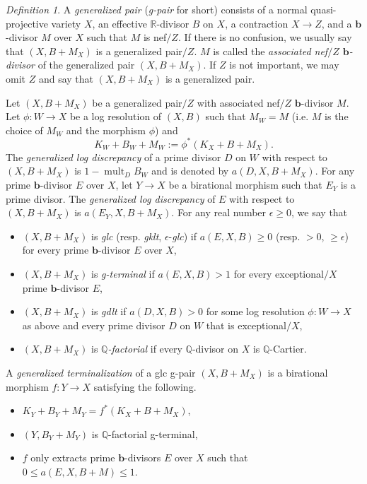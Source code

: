 \documentclass[11pt]{amsart}
\numberwithin{equation}{section}
\newcommand{\bb}{\bm{b}}
\newcommand{\Qq}{\mathbb{Q}}
\newcommand{\Rr}{\mathbb{R}}
\newcommand{\mult}{\operatorname{mult}}
\theoremstyle{definition}
\theoremstyle{remark}
\newtheorem{defn}[thm]{Definition}
\theoremstyle{definition}
\begin{document}
\begin{defn}\label{defn: gpair} A \emph{generalized pair} (\emph{g-pair} for short) consists of a normal quasi-projective variety $X$, an effective $\Rr$-divisor $B$ on $X$, a contraction $X\rightarrow Z$, and a $\bb$-divisor $M$ over $X$ such that $M$ is nef$/Z$. If there is no confusion, we usually say that $(X,B+M_X)$ is a generalized pair$/Z$. $M$ is called the \emph{associated nef$/Z$ $\bb$-divisor} of the generalized pair $(X,B+M_X)$. If $Z$ is not important, we may omit $Z$ and say that $(X,B+M_X)$ is a generalized pair.

Let $(X,B+M_X)$ be a generalized pair$/Z$ with associated nef$/Z$ $\bb$-divisor $M$. Let $\phi:W\to X$
	be a log resolution of $(X,B)$ such that $M_W=M$ (i.e. $M$ is the choice of $M_W$ and the morphism $\phi$) and
	$$K_W+B_W+M_W:=\phi^{*}(K_X+B+M_X).$$
	The \emph{generalized log discrepancy} of a prime divisor $D$ on $W$ with respect to $(X,B+M_X)$ is $1-\mult_{D}B_W$ and is denoted by $a(D,X,B+M_X).$ For any prime $\bb$-divisor $E$ over $X$, let $Y\rightarrow X$ be a birational morphism such that $E_Y$ is a prime divisor.  The \emph{generalized log discrepancy} of $E$ with respect to $(X,B+M_X)$ is $a(E_Y,X,B+M_X)$.
	For any real number $\epsilon\geq 0$, we say that
	\begin{itemize}
	    \item $(X,B+M_X)$ is \emph{glc} (resp. \emph{gklt}, $\epsilon$-\emph{glc}) if $a(E,X,B)\ge0$ (resp. $>0$, $\ge\epsilon$) for every prime $\bb$-divisor $E$ over $X$,
	    \item  $(X,B+M_X)$ is \emph{g-terminal} if $a(E,X,B)>1$ for every exceptional$/X$ prime $\bb$-divisor $E$,
	    \item $(X,B+M_X)$ is \emph{gdlt} if $a(D,X,B)>0$ for some log resolution $\phi:W\to X$ as above and every prime divisor $D$ on $W$ that is exceptional$/X$,
	    \item $(X,B+M_X)$ is \emph{$\Qq$-factorial} if every $\Qq$-divisor on $X$ is $\Qq$-Cartier.
	\end{itemize}
A \emph{generalized terminalization} of a glc g-pair $(X,B+M_X)$ is a birational morphism $f: Y\rightarrow X$ satisfying the following.
\begin{itemize}
    \item $K_Y+B_Y+M_Y=f^*(K_X+B+M_X)$,
    \item $(Y,B_Y+M_Y)$ is $\Qq$-factorial g-terminal,
    \item $f$ only extracts prime $\bb$-divisors $E$ over $X$ such that $0\leq a(E,X,B+M)\leq 1$.
\end{itemize}
\end{defn}
\end{document}
